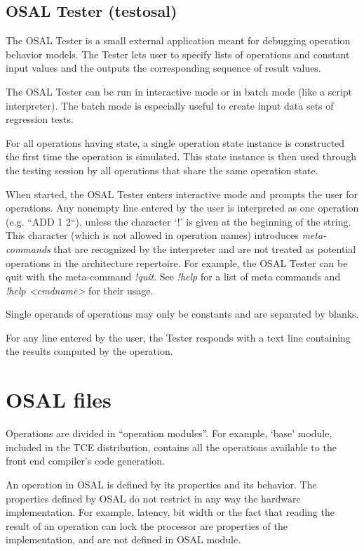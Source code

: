 \documentclass[twoside]{tceusermanual}
\begin{document}
\subsection{OSAL Tester (testosal)}
\label{sec:testosal}

The OSAL Tester is a small external application meant for debugging 
operation behavior models.  The Tester lets user to specify lists of
operations and constant input values and the outputs the corresponding sequence
of result values.

The OSAL Tester can be run in interactive mode or in batch mode (like a
script interpreter).  The batch mode is especially useful to create input
data sets of regression tests.

For all operations having state, a single operation state instance is
constructed the first time the operation is simulated. This state instance
is then used through the testing session by all operations that share the
same operation state.

When started, the OSAL Tester enters interactive mode and prompts the user
for operations. Any nonempty line entered by the user is interpreted as one
operation (e.g. ``ADD 1 2``), unless the character `!' is given at the beginning of 
the string. This character (which is not allowed in operation names) introduces
\emph{meta-commands} that are recognized by the interpreter and are not
treated as potential operations in the architecture repertoire. For example, the
OSAL Tester can be quit with the meta-command \textit{!quit}. See \textit{!help}
for a list of meta commands and \textit{!help <cmdname>} for their usage.

Single operands of operations may only be constants and are separated by
blanks.

For any line entered by the user, the Tester responds with a text line
containing the results computed by the operation.


\section{OSAL files}
\label{section:osal_details}
Operations are divided in ``operation modules''. For example, `base' module,
included in the TCE distribution, contains all the operations available 
to the front end compiler's code generation.

An operation in OSAL is defined by its properties
and its behavior.  The properties defined by OSAL do not restrict in any
way the hardware implementation.  For example, latency, bit width or the
fact that reading the result of an operation can lock the processor are
properties of the implementation, and are not defined in OSAL module.
\end{document}
